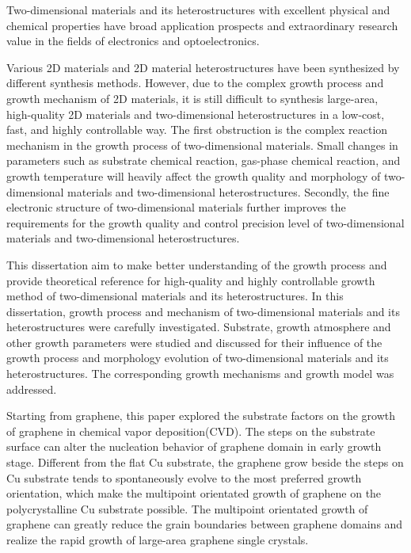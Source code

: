 \begin{englishabstract}
    Two-dimensional materials and its heterostructures with excellent physical and chemical properties have broad application prospects and extraordinary research value in the fields of electronics and optoelectronics.

    Various 2D materials and 2D material heterostructures have been synthesized by different synthesis methods. However, due to the complex growth process and growth  mechanism of 2D materials, it is still difficult to synthesis large-area, high-quality 2D materials and two-dimensional heterostructures in a low-cost, fast, and highly controllable way. The first obstruction is the complex reaction mechanism in the growth process of two-dimensional materials. Small changes in  parameters such as substrate chemical reaction, gas-phase chemical reaction, and growth temperature will heavily affect the growth quality and morphology of two-dimensional materials and two-dimensional heterostructures. Secondly, the fine electronic structure of two-dimensional materials further improves the requirements for the growth quality and control precision level of two-dimensional materials and two-dimensional heterostructures.

    This dissertation aim to make better understanding of the growth process and provide theoretical reference for high-quality and highly controllable growth method of two-dimensional materials and its heterostructures. In this dissertation, growth process and mechanism of two-dimensional materials and its heterostructures were carefully investigated. Substrate, growth atmosphere and other growth parameters were studied and discussed for their influence of the growth process and morphology evolution of two-dimensional materials and its heterostructures. The corresponding growth mechanisms and growth model was addressed.

    Starting from graphene, this paper explored the substrate factors on the growth of graphene in chemical vapor deposition(CVD). The steps on the substrate surface can alter the nucleation behavior of graphene domain in early growth stage. Different from the flat Cu substrate, the graphene grow beside the steps on Cu substrate tends to spontaneously evolve to the most preferred growth orientation, which make the multipoint orientated growth of graphene on the polycrystalline Cu substrate possible. The multipoint orientated growth of graphene can greatly reduce the grain boundaries between graphene domains and realize the rapid growth of large-area graphene single crystals.
    
    
\end{englishabstract}